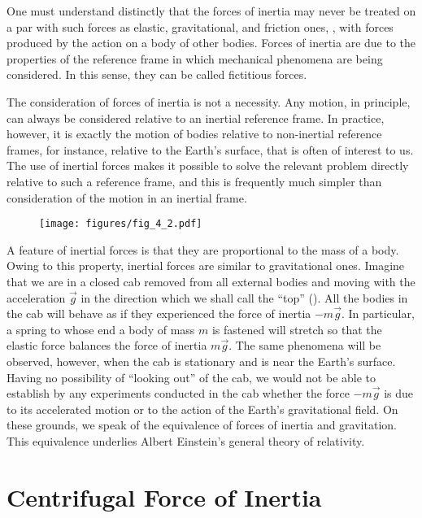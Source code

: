 One must understand distinctly that the forces of inertia may never be treated on a par with such forces as elastic, gravitational, and friction ones, \ie, with forces produced by the action on a body of other bodies. Forces of inertia are due to the properties of the reference frame in which mechanical phenomena are being considered. In this sense, they can be called fictitious forces.

The consideration of forces of inertia is not a necessity. Any motion, in principle, can always be considered relative to an inertial reference frame. In practice, however, it is exactly the motion of bodies relative to non-inertial reference frames, for instance, relative to the Earth's surface, that is often of interest to us. The use of inertial forces makes it possible to solve the relevant problem directly relative to such a reference frame, and this is frequently much simpler than consideration of the motion in an inertial frame.

\begin{figure}[t]
	\begin{center}
		\texttt{[image: figures/fig\_4\_2.pdf]}
		\caption[]{}
		\label{fig:4_2}
	\end{center}
\vspace{-0.2cm}
\end{figure}

A feature of inertial forces is that they are proportional to the mass of a body. Owing to this property, inertial forces are similar to gravitational ones. Imagine that we are in a closed cab removed from all external bodies and moving with the acceleration $\vec{g}$ in the direction which we shall call the ``top'' (). All the bodies in the cab will behave as if they experienced the force of inertia $-m\vec{g}$. In particular, a spring to whose end a body of mass $m$ is fastened will stretch so that the elastic force balances the force of inertia $m\vec{g}$. The same phenomena will be observed, however, when the cab is stationary and is near the Earth's surface. Having no possibility of ``looking out'' of the cab, we would not be able to establish by any experiments conducted in the cab whether the force $-m\vec{g}$ is due to its accelerated motion or to the action of the Earth's gravitational field. On these grounds, we speak of the equivalence of forces of inertia and gravitation. This equivalence underlies Albert Einstein's general theory of relativity.

\section{Centrifugal Force of Inertia}\label{sec:4_2}

